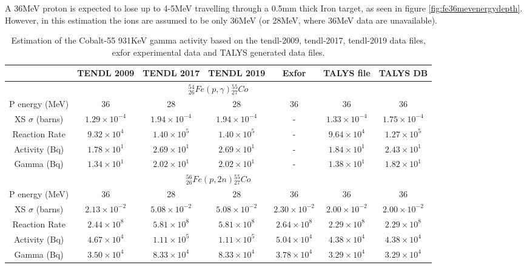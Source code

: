 A 36MeV proton is expected to lose up to 4-5MeV travelling through a 0.5mm thick Iron target, as seen in figure \ref{fig:fe36mevenergydepth}.  However, in this estimation the ions are assumed to be only 36MeV (or 28MeV, where 36MeV data are unavailable).

\begin{table}[h]
\begin{center}
\begin{tabular}{c c c c c c c}
\hline\hline
 & TENDL 2009 & TENDL 2017 & TENDL 2019 & Exfor & TALYS file & TALYS DB \\
\hline\hline
\multicolumn{7}{c}{${}^{54}_{26}Fe(p,\gamma){}^{55}_{27}Co$}\\
P energy (MeV) & 36 & 28 & 28 & 36 & 36 & 36  \\
XS $\sigma$ (barns) & $1.29 \times 10^{-4}$ & $1.94 \times 10^{-4}$ & $1.94\times 10^{-4}$ & - & $1.33 \times 10^{-4}$ & $1.75 \times 10^{-4}$ \\
Reaction Rate & $9.32 \times 10^{4}$ & $1.40 \times 10^{5}$ & $1.40 \times 10^{5}$ & -  & $9.64 \times 10^{4}$ & $1.27\times 10^{5}$ \\
Activity (Bq) & $1.78 \times 10^{1}$ & $2.69 \times 10^{1}$ & $2.69 \times 10^{1}$ & -  & $1.84 \times 10^{1}$ & $2.43 \times 10^{1}$ \\
Gamma (Bq) & $1.34 \times 10^{1}$ & $2.02 \times 10^{1}$ & $2.02 \times 10^{1}$ & -  & $1.38 \times 10^{1}$ & $1.82 \times 10^{1}$ \\
\multicolumn{7}{c}{${}^{56}_{26}Fe(p,2n){}^{55}_{27}Co$}\\
P energy (MeV) & 36 & 28 & 28 & 36 & 36 & 36  \\
XS $\sigma$ (barns) & $2.13 \times 10^{-2}$ & $5.08 \times 10^{-2}$ & $5.08\times 10^{-2}$ & $2.30\times 10^{-2}$ & $2.00 \times 10^{-2}$ & $2.00 \times 10^{-2}$ \\
Reaction Rate & $2.44 \times 10^{8}$ & $5.81 \times 10^{8}$ & $5.81 \times 10^{8}$ & $2.64 \times 10^{8}$  & $2.29 \times 10^{8}$ & $2.29\times 10^{8}$ \\
Activity (Bq) & $4.67 \times 10^{4}$ & $1.11 \times 10^{5}$ & $1.11 \times 10^{5}$ & $5.04 \times 10^{4}$  & $4.38 \times 10^{4}$ & $4.38 \times 10^{4}$ \\
Gamma (Bq) & $3.50 \times 10^{4}$ & $8.33 \times 10^{4}$ & $8.33 \times 10^{4}$ & $3.78 \times 10^{4}$  & $3.29 \times 10^{4}$ & $3.29 \times 10^{4}$ \\
\hline\hline
\end{tabular}
\end{center}
\caption{Estimation of the Cobalt-55 931KeV gamma activity based on the \acrshort{tendl}-2009\cite{tendl2009}, \acrshort{tendl}-2017\cite{tendl2017}, \acrshort{tendl}-2019\cite{tendl2019} data files, \acrshort{exfor} experimental data \cite{exforco55} and TALYS generated data files\cite{talys}.}
\label{table:activityestimation2}
\end{table}

